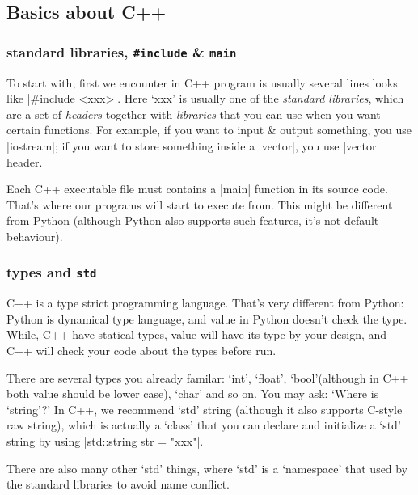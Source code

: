 \documentclass[compress,xcolor={dvipsnames}]{beamer}
\begin{document}
\subsection{Basics about C++}
\begin{frame}[fragile]
    \frametitle{standard libraries, \texttt{\#include} \& \texttt{main}}
    To start with, first we encounter in C++ program is usually several lines looks like \cverb|#include <xxx>|. Here `xxx' is usually one of the \emph{standard libraries}, which are a set of \emph{headers} together with \emph{libraries} that you can use when you want certain functions. For example, if you want to input \& output something, you use \cverb|iostream|; if you want to store something inside a \cverb|vector|, you use \cverb|vector| header.

    Each C++ executable file must contains a \cverb|main| function in its source code. That's where our programs will start to execute from. This might be different from Python (although Python also supports such features, it's not default behaviour).

\end{frame}

\begin{frame}[fragile]
    \frametitle{types and \texttt{std}}
    C++ is a type strict programming language. That's very different from Python: Python is dynamical type language, and value in Python doesn't check the type. While, C++ have statical types, value will have its type by your design, and C++ will check your code about the types before run.

    There are several types you already familar: `int', `float', `bool'(although in C++ both value should be lower case), `char' and so on. You may ask: `Where is `string'?' In C++, we recommend `std' string (although it also supports C-style raw string), which is actually a `class' that you can declare and initialize a `std' string by using \cverb|std::string str = "xxx"|.

    There are also many other `std' things, where `std' is a `namespace' that used by the standard libraries to avoid name conflict.

\end{frame}
\end{document}
